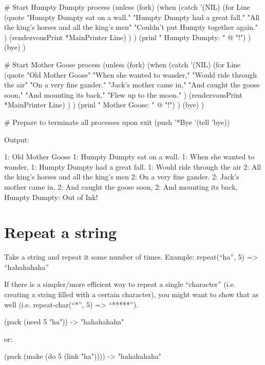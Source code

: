 \begin{wideverbatim}

# Start Humpty Dumpty process
(unless (fork)
   (when
      (catch '(NIL)
         (for Line
            (quote
               "Humpty Dumpty sat on a wall."
               "Humpty Dumpty had a great fall."
               "All the king's horses and all the king's men"
               "Couldn't put Humpty together again." )
            (rendezvousPrint *MainPrinter Line) ) )
      (prinl "      Humpty Dumpty: " @ "!") )
   (bye) )

# Start Mother Goose process
(unless (fork)
   (when
      (catch '(NIL)
         (for Line
            (quote
               "Old Mother Goose"
               "When she wanted to wander,"
               "Would ride through the air"
               "On a very fine gander."
               "Jack's mother came in,"
               "And caught the goose soon,"
               "And mounting its back,"
               "Flew up to the moon." )
            (rendezvousPrint *MainPrinter Line) ) )
      (prinl "      Mother Goose: " @ "!") )
   (bye) )

# Prepare to terminate all processes upon exit
(push '*Bye '(tell 'bye))

Output:

1: Old Mother Goose
1: Humpty Dumpty sat on a wall.
1: When she wanted to wander,
1: Humpty Dumpty had a great fall.
1: Would ride through the air
2: All the king's horses and all the king's men
2: On a very fine gander.
2: Jack's mother came in,
2: And caught the goose soon,
2: And mounting its back,
      Humpty Dumpty: Out of Ink!

\end{wideverbatim}

\pagebreak{}
\section*{Repeat a string}

Take a string and repeat it some number of times. Example:
repeat(``ha'', 5) =\textgreater{} ``hahahahaha''

If there is a simpler/more efficient way to repeat a single
``character'' (i.e. creating a string filled with a certain character),
you might want to show that as well (i.e. repeat-char(``*'', 5)
=\textgreater{} ``*****'').

\begin{wideverbatim}

(pack (need 5 "ha"))
-> "hahahahaha"

or:

(pack (make (do 5 (link "ha"))))
-> "hahahahaha"

\end{wideverbatim}


